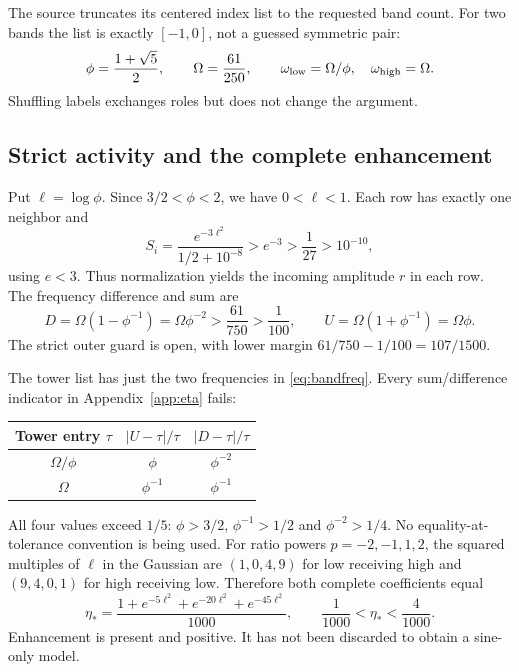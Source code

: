 \documentclass[11pt,a4paper]{article}
\theoremstyle{definition}
\theoremstyle{remark}\newtheorem{remark}[theorem]{Remark}
\numberwithin{equation}{section}
\begin{document}
The source truncates its centered index list to the requested band count.
For two bands the list is exactly $[-1,0]$, not a guessed symmetric pair:
\begin{equation}\label{eq:bandfreq}
 \phi=\frac{1+\sqrt5}{2},\qquad \Omega=\frac{61}{250},
 \qquad \omega_{\rm low}=\Omega/\phi,\quad\omega_{\rm high}=\Omega.
\end{equation}
Shuffling labels exchanges roles but does not change the argument.

\subsection{Strict activity and the complete enhancement}
Put $\ell=\log\phi$. Since $3/2<\phi<2$, we have $0<\ell<1$.
Each row has exactly one neighbor and
\begin{equation}\label{eq:bandactive}
 S_i=\frac{e^{-3\ell^2}}{1/2+10^{-8}}
        >e^{-3}>\frac1{27}>10^{-10},
\end{equation}
using $e<3$. Thus normalization yields the incoming amplitude $r$ in each row.
The frequency difference and sum are
\begin{equation}\label{eq:bandguard}
 D=\Omega(1-\phi^{-1})=\Omega\phi^{-2}
   >\frac{61}{750}>\frac1{100},
 \qquad U=\Omega(1+\phi^{-1})=\Omega\phi.
\end{equation}
The strict outer guard is open, with lower margin
$61/750-1/100=107/1500$.

The tower list has just the two frequencies in \eqref{eq:bandfreq}.
Every sum/difference indicator in Appendix~\ref{app:eta} fails:
\begin{center}
\begin{tabular}{@{}ccc@{}}
\toprule Tower entry $\tau$ & $|U-\tau|/\tau$ & $|D-\tau|/\tau$\\
\midrule
$\Omega/\phi$ & $\phi$ & $\phi^{-2}$\\
$\Omega$ & $\phi^{-1}$ & $\phi^{-1}$\\
\bottomrule
\end{tabular}
\end{center}
All four values exceed $1/5$: $\phi>3/2$, $\phi^{-1}>1/2$ and
$\phi^{-2}>1/4$. No equality-at-tolerance convention is being used.
For ratio powers $p=-2,-1,1,2$, the squared multiples of $\ell$ in the Gaussian
are $(1,0,4,9)$ for low receiving high and $(9,4,0,1)$ for high receiving low.
Therefore both complete coefficients equal
\begin{equation}\label{eq:etastar}
 \eta_*=\frac{1+e^{-5\ell^2}+e^{-20\ell^2}+e^{-45\ell^2}}{1000},
 \qquad \frac1{1000}<\eta_*<\frac4{1000}.
\end{equation}
Enhancement is present and positive. It has not been discarded to obtain a
sine-only model.
\end{document}
